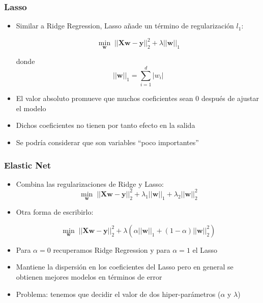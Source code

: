 \documentclass{beamer}
\newcommand{\Xbf}{\ensuremath{\mathbf{X}}}
\newcommand{\wbf}{\ensuremath{\mathbf{w}}}
\newcommand{\ybf}{\ensuremath{\mathbf{y}}}
\begin{document}
\begin{frame}
\frametitle{Lasso}

\begin{itemize}
\item Similar a Ridge Regression, Lasso añade un término de regularización $l_1$:

$$\min_\wbf\;||\Xbf\wbf - \ybf||^2_2 + \lambda||\wbf||_1$$

donde 
$$||\wbf||_1 = \sum_{i=1}^{d}{|w_i|}$$

\item El valor absoluto promueve que muchos coeficientes sean $0$ después de ajustar el modelo

\item Dichos coeficientes no tienen por tanto efecto en la salida

\item Se podría considerar que son variables ``poco importantes''
\end{itemize}
\end{frame}


\begin{frame}
\frametitle{Elastic Net}

\begin{itemize}
\item Combina las regularizaciones de Ridge y Lasso:
$$\min_\wbf\;||\Xbf\wbf - \ybf||^2_2 + \lambda_1||\wbf||_1 + \lambda_2||\wbf||_2^2$$

\item Otra forma de escribirlo:

$$\min_\wbf\;||\Xbf\wbf - \ybf||^2_2 + \lambda(\alpha||\wbf||_1 + (1 - \alpha)||\wbf||_2^2)$$

\item Para $\alpha = 0$ recuperamos Ridge Regression y para $\alpha = 1$ el Lasso

\item Mantiene la dispersión en los coeficientes del Lasso pero en general se obtienen mejores modelos en términos de error

\item Problema: tenemos que decidir el valor de dos hiper-parámetros ($\alpha$ y $\lambda$)
\end{itemize}
\end{frame}
\end{document}
